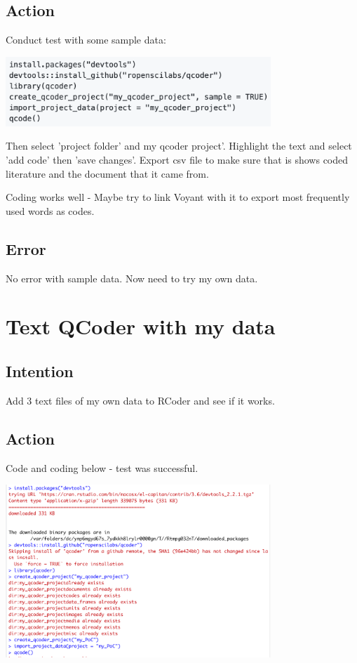 \documentclass{article}
\begin{document}
\subsection{Action}
Conduct test with some sample data:

\includegraphics[width=10cm]{QCoder.png}

Then select 'project folder' and my qcoder project'. Highlight the text and select 'add code' then 'save changes'. Export csv file to make sure that is shows coded literature and the document that it came from. 

Coding works well - Maybe try to link Voyant with it to export most frequently used words as codes. 

\subsection{Error}
No error with sample data. Now need to try my own data. 

\section{Text QCoder with my data}
\subsection{Intention}
Add 3 text files of my own data to RCoder and see if it works.
\subsection{Action}
Code and coding below - test was successful.

\includegraphics[width=10cm]{QCoder2.png}
\end{document}
